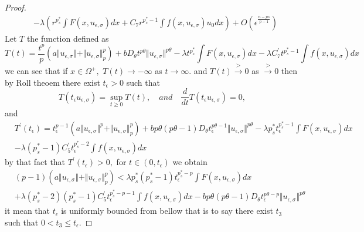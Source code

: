 \documentclass[10pt,twoside,reqno,centertags,draft]{amsart}
\begin{document}
\begin{proof}
\begin{equation}
\begin{aligned}
& -\lambda\left( r^{p_s^*}\int F(x,u_{\epsilon,\sigma})dx +C_{7} r^{p_s^* -1}\int f(x, u_{\epsilon,\sigma})u_0 dx\right) +O(\epsilon^{\frac{n -ps}{p -1}})
\end{aligned}
\end{equation}
Let $ T$ the function defined as 
{\scriptsize
\begin{equation}\label{eee30}
T(t) =\frac{t^{p}}{p}\left( a\Vert u_{\epsilon,\sigma}\Vert +\Vert u_{\epsilon,\sigma}\Vert^{p}_{p}\right) +b D_{\theta} t^{p\theta}\Vert u_{\epsilon,\sigma}\Vert^{p\theta} -\lambda t^{p_s^*}\int F(x,u_{\epsilon,\sigma})dx -\lambda C_{7}^{\prime} t^{p_s^* -1}\int f(x, u_{\epsilon,\sigma}) dx
\end{equation}
}
we can see that if $ x \in \Omega^{+},$ $ T(t) \longrightarrow -\infty$ as $ t \to \infty.$ and $ T(t) \xrightarrow{>} 0$ as $ \xrightarrow{>}0$ then by Roll theoem there exist $ t_{\epsilon} >0$
such that 
\begin{equation*}
T(t_{\epsilon}u_{\epsilon,\sigma}) =\sup_{t \geq 0}T(t), \quad \textit{and} \quad \frac{d}{dt}T(t_{\epsilon}u_{\epsilon,\sigma}) =0,
\end{equation*}
and
\begin{equation*}
\begin{aligned}
& T^{\prime}(t_{\epsilon}) =t_{\epsilon}^{p -1}\left( a\Vert u_{\epsilon,\sigma}\Vert^{p} +\Vert u_{\epsilon,\sigma}\Vert^{p}_{p}\right) +b p\theta(p\theta -1)
 D_{\theta} t_{\epsilon}^{p\theta -1}\Vert u_{\epsilon,\sigma}\Vert^{p\theta} -\lambda p_s^* t_{\epsilon}^{p_s^* -1}\int F(x,u_{\epsilon,\sigma})dx\\
& -\lambda (p_s^* -1)C_{5}^{\prime} t_{\epsilon}^{p_s^* -2}\int f(x, u_{\epsilon,\sigma}) dx
\end{aligned}
\end{equation*}
by that fact that $ T^{\prime}(t_{\epsilon}) >0,$ for $ t \in (0, t_{\epsilon})$ we obtain
\begin{equation*}
\begin{aligned}
& (p -1)\left( a\Vert u_{\epsilon,\sigma}\Vert +\Vert u_{\epsilon,\sigma}\Vert^{p}_{p}\right) <\lambda p_s^* (p_s^* -1)t_{\epsilon}^{p_s^* -p}\int F(x,u_{\epsilon,\sigma})dx\\
& +\lambda (p_s^* -2)(p_s^* -1)C_{5}^{\prime} t_{\epsilon}^{p_s^* -p-1}\int f(x, u_{\epsilon,\sigma}) dx -b p\theta (p\theta -1)D_{\theta} t_{\epsilon}^{p\theta -p}\Vert u_{\epsilon,\sigma}\Vert^{p\theta}
\end{aligned}
\end{equation*}
it mean that $ t_{\epsilon}$ is uniformly bounded from bellow that is to say there exist $ t_3$ such that $ 0 <t_3 \leq t_{\epsilon}.$ 

\end{proof}
\end{document}
